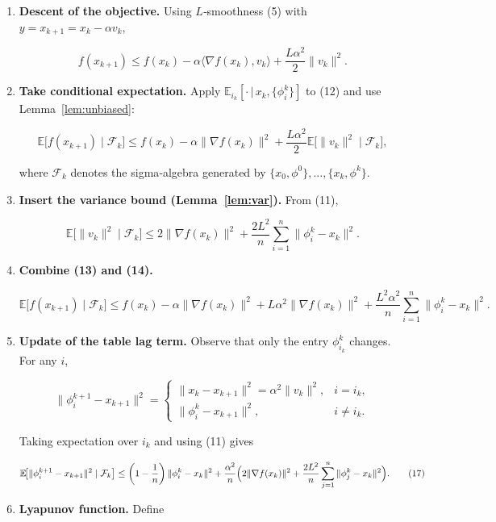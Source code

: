 \documentclass{article}
\newcommand{\E}{\mathbb{E}}
\newcommand{\grad}{\nabla}
\begin{document}
\begin{enumerate}[label=[Step \arabic*]]
\item \textbf{Descent of the objective.}  
Using $L$‑smoothness (5) with $y=x_{k+1}=x_k-\alpha v_k$,

\[
f(x_{k+1})\le f(x_k)-\alpha\langle\grad f(x_k),v_k\rangle
               +\frac{L\alpha^{2}}{2}\|v_k\|^{2}.
\tag{12}
\]

\item \textbf{Take conditional expectation.}  
Apply $\E_{i_k}[\cdot\,|\,x_k,\{\phi_i^{k}\}]$ to (12) and use Lemma~\ref{lem:unbiased}:

\[
\E\!\bigl[f(x_{k+1})\mid\mathcal F_k\bigr]
\le f(x_k)-\alpha\|\grad f(x_k)\|^{2}
   +\frac{L\alpha^{2}}{2}\E\!\bigl[\|v_k\|^{2}\mid\mathcal F_k\bigr],
\tag{13}
\]

where $\mathcal F_k$ denotes the sigma‑algebra generated by $\{x_0,\phi^0\},\dots,\{x_k,\phi^k\}$.

\item \textbf{Insert the variance bound (Lemma~\ref{lem:var}).}  
From (11),

\[
\E\!\bigl[\|v_k\|^{2}\mid\mathcal F_k\bigr]
\le 2\|\grad f(x_k)\|^{2}
   +\frac{2L^{2}}{n}\sum_{i=1}^{n}\|\phi_i^{k}-x_k\|^{2}.
\tag{14}
\]

\item \textbf{Combine (13) and (14).}  

\[
\E\!\bigl[f(x_{k+1})\mid\mathcal F_k\bigr]
\le f(x_k)-\alpha\|\grad f(x_k)\|^{2}
   +L\alpha^{2}\|\grad f(x_k)\|^{2}
   +\frac{L^{2}\alpha^{2}}{n}\sum_{i=1}^{n}\|\phi_i^{k}-x_k\|^{2}.
\tag{15}
\]

\item \textbf{Update of the table lag term.}  
Observe that only the entry $\phi_{i_k}^{k}$ changes. For any $i$,

\[
\|\phi_i^{k+1}-x_{k+1}\|^{2}
=
\begin{cases}
\|x_k-x_{k+1}\|^{2}= \alpha^{2}\|v_k\|^{2}, & i=i_k,\\[4pt]
\|\phi_i^{k}-x_{k+1}\|^{2}, & i\neq i_k.
\end{cases}
\tag{16}
\]

Taking expectation over $i_k$ and using (11) gives  

\[
\E\!\bigl[\|\phi_i^{k+1}-x_{k+1}\|^{2}\mid\mathcal F_k\bigr]
\le
\left(1-\frac1n\right)\|\phi_i^{k}-x_k\|^{2}
+\frac{\alpha^{2}}{n}\Bigl(2\|\grad f(x_k)\|^{2}
+\frac{2L^{2}}{n}\sum_{j=1}^{n}\|\phi_j^{k}-x_k\|^{2}\Bigr).
\tag{17}
\]

\item \textbf{Lyapunov function.}  
Define  


\end{enumerate}
\end{document}
